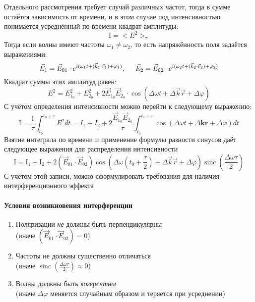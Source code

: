 \documentclass[a4paper, 12pt]{extarticle}
\newcommand{\vect}[1]{\vec{#1}} %
\renewcommand{\phi}{\varphi} %
\newcommand{\I}{\mathrm{I}} %
\begin{document}
  Отдельного рассмотрения требует случай различных частот, тогда в сумме остаётся зависимость от
  времени, и в этом случае под интенсивностью понимается усреднённый по времени квадрат амплитуды:
    \[
      \I = {<{E}}^2{>}_\tau
    \]
  Тогда если волны имеют частоты $\omega_1 \neq \omega_2$, то есть напряжённость поля задаётся
  выражениями:
    \[
      \vect{E}_1=\vect{E}_{01}\cdot e^{i({\omega}_{1}t + (\vect{k}_1 \cdot \vect{r}_1) + {\phi}_1)},
      \hspace{5mm}
      \vect{E}_2=\vect{E}_{02}\cdot e^{i({\omega}_{2}t + (\vect{k}_2 \cdot \vect{r}_2) + {\phi}_2)}
    \]
  Квадрат суммы этих амплитуд равен:
  \[
    E^2=E^2_{1_0}+E^2_{2_0}+2\vect{E}_{1_{0}}\vect{E}_{2_{0}}
    \cdot
    \cos(\Delta\omega t+\Delta{\vect{k}\vect{r}}+\Delta\varphi)
  \]
  С учётом определения интенсивности можно перейти к следующему выражению:
  \[
    \I=\frac{1}{\tau} \int_{t_0}^{t_0+\tau} E^2 dt = I_1+I_2+2\frac{\vect{E}_{1_{0}}\vect{E}_{2_{0}}}{\tau} \int_{t_0}^{t_0+\tau} \cos(\Delta\omega t+\Delta{\mathbf {kr}}+\Delta\varphi) dt
  \]
  Взятие интеграла по времени и применение формулы разности синусов даёт следующее выражения для распределения интенсивности
  \[
    \I = \I_1 + \I_2 + 2(\vect{E}_{01} \cdot \vect{E}_{02}) \cos \left(
      \Delta\omega (t_0+\frac{\tau}{2}) + \Delta \vect{k}\vect{r} + \Delta\phi
    \right) \operatorname{sinc}(\frac{\Delta\omega\tau}{2})
  \]
  С учётом этой записи, можно сформулировать требования для наличия интерференционного эффекта

  \paragraph{Условия возникновения интерференции}
  \begin{enumerate}
    \item Поляризации \emph{не} должны быть перпендикулярны\\
      {(иначе $(\vect{E}_{01} \cdot \vect{E}_{02}) = 0$)}
      \vspace{2mm}
    \item Частоты не должны существенно отличаться\\
      {(иначе $\operatorname{sinc}(\frac{\Delta\omega\tau}{2}) \approx 0$)}
      \vspace{2mm}
    \item Волны должны быть \emph{когерентны}\\
      {(иначе $\Delta\phi$ меняется случайным образом и теряется при усреднении)}
  \end{enumerate}
  
\end{document}
